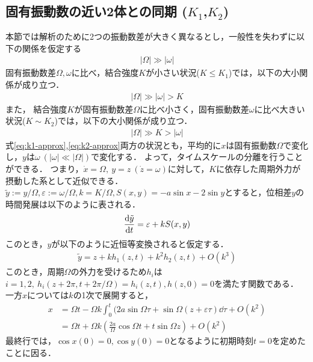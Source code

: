 \documentclass[../main]{subfiles}
\begin{document}
    \subsection{固有振動数の近い2体との同期 ($K_1$,$K_2$)}
    \label{sec:3body-k12}
    本節では解析のために2つの振動数差が大きく異なるとし，一般性を失わずに以下の関係を仮定する
    \begin{align}
        \label{eq:assume}
        |\Omega|\gg|\omega|
    \end{align}
    固有振動数差$\Omega,\omega$に比べ，結合強度$K$が小さい状況($K\leq K_1$)では，以下の大小関係が成り立つ．
    \begin{align}
        \label{eq:k1-approx}
        |\Omega|\gg|\omega|>K
    \end{align}
    また，
    結合強度$K$が固有振動数差$\Omega$に比べ小さく，固有振動数差$\omega$に比べ大きい状況($K\sim K_2$)では，以下の大小関係が成り立つ．
    \begin{align}
        \label{eq:k2-approx}
        |\Omega|\gg K>|\omega|
    \end{align}
    式\eqref{eq:k1-approx},\eqref{eq:k2-approx}両方の状況とも，平均的に$x$は固有振動数$\Omega$で変化し，$y$は$\omega\ (|\omega|\ll|\Omega|)$で変化する．
    よって，タイムスケールの分離を行うことができる．
    つまり，$\dot{x}=\Omega,\ y=z\ (\dot{z}=\omega)$に対して，$K$に依存した周期外力が摂動した系として近似できる．\\
    $\tilde{y}:=y/\Omega,\varepsilon:=\omega/\Omega,k=K/\Omega,S(x,y)=-a\sin x-2\sin y$とすると，位相差$y$の時間発展は以下のように表される．
    \begin{align*}
        \dv{\tilde{y}}{t}=\varepsilon+k S(x,y) 
    \end{align*}
    このとき，$y$が以下のように近恒等変換されると仮定する．
    \begin{align}
        \tilde{y}=z+kh_1(z,t)+k^2h_2(z,t)+O(k^3)
        \label{eq:pertu-ytilde}
    \end{align}
    このとき，周期$\Omega$の外力を受けるため$h_i$は$i=1,2,\ h_i(z+2\pi,t+2\pi/\Omega)=h_i(z,t),h(z,0)=0$を満たす関数である．
    一方$x$については$k$の1次で展開すると，
    \begin{align*}
        x&=\Omega t-\Omega k\int_0^t(2a\sin \Omega\tau+\sin\Omega (z+\varepsilon\tau)\dd{\tau}+O(k^2)\\ 
        &=\Omega t+\Omega k\left(\frac{2a}{\Omega}\cos\Omega t+t\sin \Omega z\right)+O(k^2)
    \end{align*}
    最終行では，$\cos x(0)=0,\cos y(0)=0$となるように初期時刻$t=0$を定めたことに因る．
\end{document}
